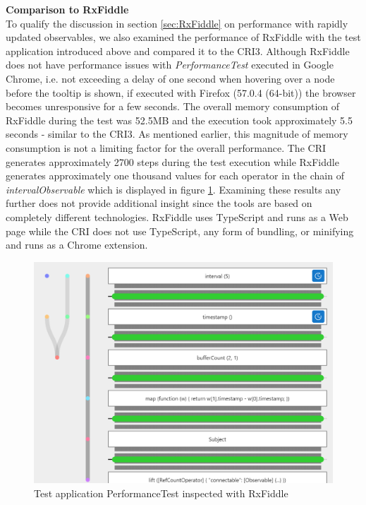 	\textbf{Comparison to RxFiddle}\\
	To qualify the discussion in section \ref{sec:RxFiddle} on performance with rapidly updated observables, we also examined the performance of RxFiddle with the test application introduced above and compared it to the CRI3. Although RxFiddle does not have performance issues with \emph{PerformanceTest} executed in Google Chrome, i.e. not exceeding a delay of one second when hovering over a node before the tooltip is shown, if executed with Firefox (57.0.4 (64-bit)) the browser becomes unresponsive for a few seconds. The overall memory consumption of RxFiddle during the test was 52.5MB and the execution took approximately 5.5 seconds - similar to the CRI3. As mentioned earlier, this magnitude of memory consumption is not a limiting factor for the overall performance. The CRI generates approximately 2700 steps during the test execution while RxFiddle generates approximately one thousand values for each operator in the chain of \emph{intervalObservable} which is displayed in figure \ref{fig:RxFiddlePerformance}. Examining these results any further does not provide additional insight since the tools are based on completely different technologies. RxFiddle uses TypeScript and runs as a Web page while the CRI does not use TypeScript, any form of bundling, or minifying and runs as a Chrome extension.
	\begin{figure}[!h]
		\centering
		\includegraphics[scale=0.7,trim=0 0 0 0]{gfx/RxFiddleWithTimer.png}
		\caption{Test application PerformanceTest inspected with RxFiddle}
		\label{fig:RxFiddlePerformance}
	\end{figure}
	
